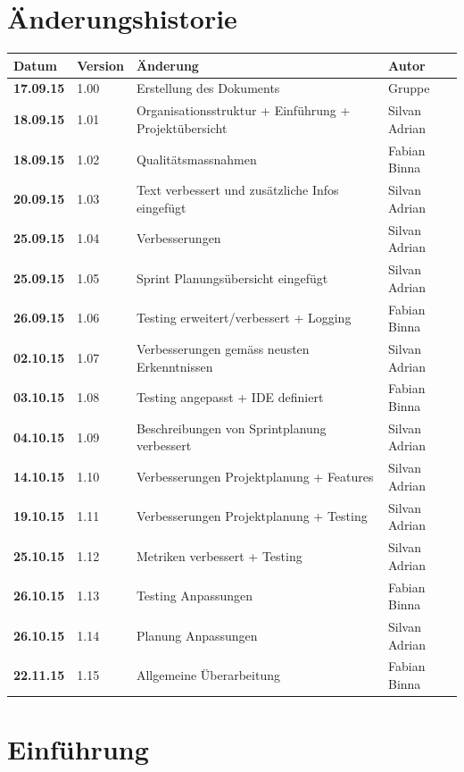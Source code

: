 \documentclass[11pt]{scrartcl}
\begin{document}
\section{Änderungshistorie}
\begin{tabularx}{\textwidth}{l l X l}
\textbf{Datum} & \textbf{Version} & \textbf{Änderung}  & \textbf{Autor} \\
\hline
\textbf{17.09.15} & 1.00 & Erstellung des Dokuments & Gruppe \\
\textbf{18.09.15} & 1.01 & Organisationsstruktur + Einführung + 
Projektübersicht & Silvan Adrian\\
\textbf{18.09.15} & 1.02 & Qualitätsmassnahmen & Fabian Binna\\
\textbf{20.09.15} & 1.03 &  Text verbessert und zusätzliche Infos eingefügt & Silvan Adrian\\
\textbf{25.09.15} & 1.04 & Verbesserungen & Silvan Adrian\\
\textbf{25.09.15} & 1.05 & Sprint Planungsübersicht eingefügt & Silvan Adrian\\
\textbf{26.09.15} & 1.06 & Testing erweitert/verbessert + Logging & Fabian 
Binna\\
\textbf{02.10.15} & 1.07 & Verbesserungen gemäss neusten Erkenntnissen & Silvan 
Adrian\\
\textbf{03.10.15} & 1.08 & Testing angepasst + IDE definiert & Fabian Binna\\
\textbf{04.10.15} & 1.09 & Beschreibungen von Sprintplanung verbessert & Silvan 
Adrian\\
\textbf{14.10.15} & 1.10 &  Verbesserungen Projektplanung + Features & Silvan 
Adrian\\
\textbf{19.10.15} & 1.11 &  Verbesserungen Projektplanung + Testing & Silvan 
Adrian\\
\textbf{25.10.15} & 1.12 &  Metriken verbessert + Testing & Silvan 
Adrian\\
\textbf{26.10.15} & 1.13 & Testing Anpassungen & Fabian Binna\\
\textbf{26.10.15} & 1.14 & Planung Anpassungen & Silvan Adrian\\
\textbf{22.11.15} & 1.15 & Allgemeine Überarbeitung & Fabian Binna\\
\end{tabularx}

\newpage
\tableofcontents
\newpage

\section{Einführung}
\end{document}
